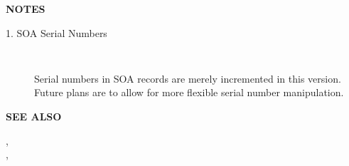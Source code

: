 {\bf NOTES}

\begin{description}

\item [1.  SOA Serial Numbers]\verb" "

Serial numbers in SOA records are merely incremented in this version.  Future
plans are to allow for more flexible serial number manipulation.

\end{description}

{\bf SEE ALSO}

,\\
,\\

